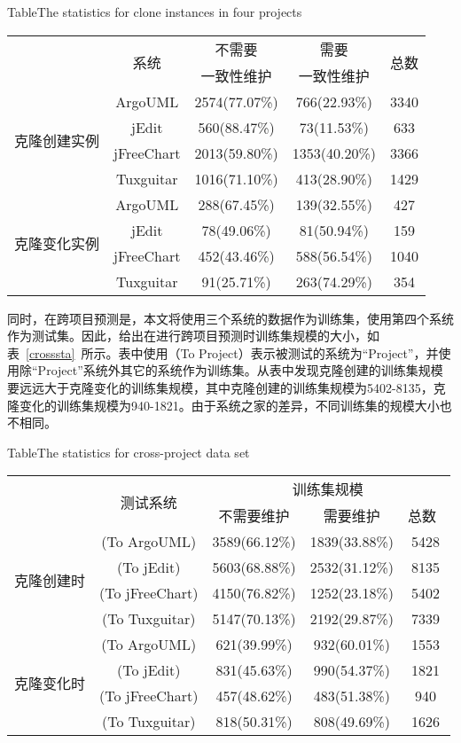 \begin{table}[htbp]
{Table$\!$}{The statistics for clone instances in four projects}
\vspace{0.5em}
\centering
\wuhao
\begin{tabular}{ccccc}
\toprule[1.5pt]
~\multirow{2}{*}{类型}&\multirow{2}{*}{系统}&{不需要}&{需要}&\multirow{2}{*}{总数}\\
~&~&{一致性维护}&{一致性维护}&~\\
\midrule[1pt]
\multirow{4}{*}{克隆创建实例}
&ArgoUML&	2574(77.07\%)&	766(22.93\%)&	3340\\
&jEdit&560(88.47\%)&	73(11.53\%)&	633\\
&jFreeChart&	2013(59.80\%)&	1353(40.20\%)&	3366\\
&Tuxguitar&	1016(71.10\%)&	413(28.90\%)&	1429\\
\hline
\multirow{4}{*}{克隆变化实例}
&ArgoUML&288(67.45\%)&139(32.55\%)&427\\
&jEdit&78(49.06\%)&81(50.94\%)&159\\
&jFreeChart&452(43.46\%)&588(56.54\%)&1040\\
&Tuxguitar&91(25.71\%)&263(74.29\%)&354\\
\bottomrule[1.5pt]
\end{tabular}
\end{table}

同时，在跨项目预测是，本文将使用三个系统的数据作为训练集，使用第四个系统作为测试集。因此，给出在进行跨项目预测时训练集规模的大小，如表~\ref{crosssta}~所示。表中使用（To Project）表示被测试的系统为“Project”，并使用除“Project”系统外其它的系统作为训练集。从表中发现克隆创建的训练集规模要远远大于克隆变化的训练集规模，其中克隆创建的训练集规模为5402-8135，克隆变化的训练集规模为940-1821。由于系统之家的差异，不同训练集的规模大小也不相同。

\begin{table}[htbp]
{Table$\!$}{The statistics for cross-project data set}
\vspace{0.5em}
\centering
\wuhao
\begin{tabular}{ccccc}
\toprule[1.5pt]
~\multirow{2}{*}{类型}&\multirow{2}{*}{测试系统}&\multicolumn{3}{c}{训练集规模}\\
\cline{3-5}
~&~&{不需要维护}&{需要维护}&{总数}~\\
\midrule[1pt]
\multirow{4}{*}{克隆创建时}
&(To ArgoUML)&3589(66.12\%)&1839(33.88\%)&5428\\
&(To jEdit)&5603(68.88\%)&2532(31.12\%)&8135\\
&(To jFreeChart)&4150(76.82\%)&1252(23.18\%)&5402\\
&(To Tuxguitar)&	5147(70.13\%)&2192(29.87\%)&	7339\\
\hline
\multirow{4}{*}{克隆变化时}
&(To ArgoUML)&621(39.99\%)&932(60.01\%)&1553\\
&(To jEdit)&831(45.63\%)&990(54.37\%)&1821\\
&(To jFreeChart)&457(48.62\%)&483(51.38\%)&940\\
&(To Tuxguitar)&	818(50.31\%)&808(49.69\%)&1626\\
\bottomrule[1.5pt]
\end{tabular}
\end{table}


